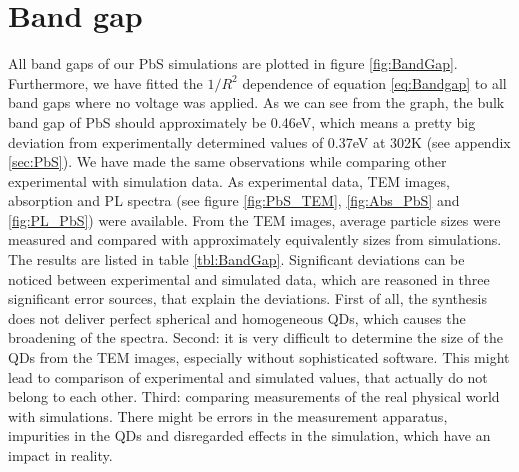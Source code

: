\chapter{Band gap} \label{sec:BandGapAnalysis}

	All band gaps of our PbS simulations are plotted in figure \ref{fig:BandGap}. Furthermore, we have fitted the $1/R^2$ dependence of
	equation \ref{eq:Bandgap} to all band gaps where no voltage was applied.
	As we can see from the graph, the bulk band gap of \gls{PbS} should approximately be 0.46eV, which means a pretty big deviation
	from experimentally determined values of 0.37eV at 302K (see appendix \ref{sec:PbS}). We have made the same observations while comparing
	other experimental with simulation data. As experimental data, \gls{TEM} images, absorption and \gls{PL} spectra (see figure \ref{fig:PbS_TEM},
	\ref{fig:Abs_PbS} and \ref{fig:PL_PbS}) were available. From the \gls{TEM} images, average particle sizes were measured and compared
	with approximately equivalently sizes from simulations. The results are listed in table \ref{tbl:BandGap}. Significant deviations
	can be noticed between experimental and simulated data, which are reasoned in three significant error sources, that explain the deviations.
	First of all, the synthesis does not deliver perfect spherical and homogeneous \glspl{QD}, which causes the broadening of the spectra.
	Second: it is very difficult to determine the size of the \glspl{QD} from the \gls{TEM} images, especially without
	sophisticated software. This might lead to comparison of experimental and simulated values, that actually do not belong to each other.
	Third: comparing measurements of the real physical world with simulations. There might be errors in the measurement
	apparatus, impurities in the \glspl{QD} and disregarded effects in the simulation, which have an impact in reality.
	
